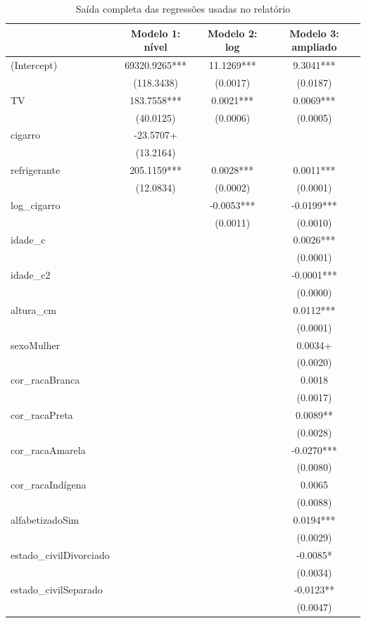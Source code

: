 \begin{table}
\centering
\caption{Saída completa das regressões usadas no relatório}
\centering
\begin{tabular}[t]{lccc}
\toprule
  & Modelo 1: nível & Modelo 2: log & Modelo 3: ampliado\\
\midrule
(Intercept) & 69320.9265*** & 11.1269*** & 9.3041***\\
 & (118.3438) & (0.0017) & (0.0187)\\
TV & 183.7558*** & 0.0021*** & 0.0069***\\
 & (40.0125) & (0.0006) & (0.0005)\\
cigarro & -23.5707+ &  & \\
 & (13.2164) &  & \\
refrigerante & 205.1159*** & 0.0028*** & 0.0011***\\
 & (12.0834) & (0.0002) & (0.0001)\\
log\_cigarro &  & -0.0053*** & -0.0199***\\
 &  & (0.0011) & (0.0010)\\
idade\_c &  &  & 0.0026***\\
 &  &  & \vphantom{1} (0.0001)\\
idade\_c2 &  &  & -0.0001***\\
 &  &  & (0.0000)\\
altura\_cm &  &  & 0.0112***\\
 &  &  & (0.0001)\\
sexoMulher &  &  & 0.0034+\\
 &  &  & (0.0020)\\
cor\_racaBranca &  &  & 0.0018\\
 &  &  & (0.0017)\\
cor\_racaPreta &  &  & 0.0089**\\
 &  &  & (0.0028)\\
cor\_racaAmarela &  &  & -0.0270***\\
 &  &  & (0.0080)\\
cor\_racaIndígena &  &  & 0.0065\\
 &  &  & (0.0088)\\
alfabetizadoSim &  &  & 0.0194***\\
 &  &  & \vphantom{1} (0.0029)\\
estado\_civilDivorciado &  &  & -0.0085*\\
 &  &  & (0.0034)\\
estado\_civilSeparado &  &  & -0.0123**\\
 &  &  & (0.0047)\\

\end{tabular}
\end{table}
